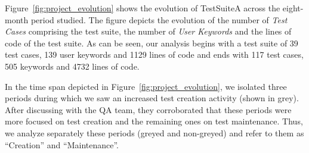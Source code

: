 Figure~\ref{fig:project_evolution} shows the evolution of TestSuiteA across the eight-month period studied. The figure depicts the evolution of the number of \emph{Test Cases} comprising the test suite, the number of \emph{User Keywords} and the lines of code of the test suite. As can be seen, our analysis begins with a test suite of 39 test cases, 139 user keywords and 1129 lines of code and ends with 117 test cases, 505 keywords and 4732 lines of code.

In the time span depicted in Figure~\ref{fig:project_evolution}, we isolated three periods during which we saw an increased test creation activity (shown in grey). After discussing with the QA team, they corroborated that these periods were more focused on test creation and the remaining ones on test maintenance. Thus, we analyze separately these periods (greyed and non-greyed) and refer to them as ``Creation'' and ``Maintenance''.